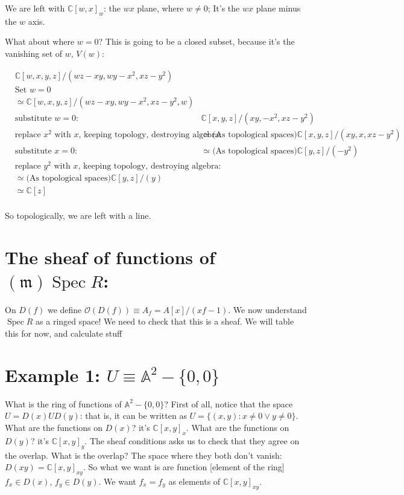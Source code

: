 \documentclass{book}
\newcommand{\C}{\ensuremath{\mathbb{C}}}
\newcommand{\A}{\ensuremath{\mathbb{A}}}
\renewcommand{\O}{\ensuremath{\mathcal{O}}}
\newcommand{\Spec}{\operatorname{Spec}}
\newcommand{\m}{\mathfrak{m}}
\theoremstyle{definition}
\begin{document}
We are left with $\C[w, x]_w$: the $wx$ plane, where $w \neq 0$;
It's the $wx$ plane minus the $w$ axis.

What about where $w = 0$? This is going to be a closed subset, because it's
the vanishing set of $w$, $V(w)$:

\begin{align*}
&\C[w, x, y, z]/(wz - xy, wy - x^2, xz - y^2) \\
&\text{Set $w = 0$} \\
&\simeq \C[w, x, y, z]/(wz - xy, wy - x^2, xz - y^2, w) \\
&\text{substitute $w = 0:$}
&\C[x, y, z]/(xy, - x^2, xz - y^2) \\
&\text{replace $x^2$ with $x$, keeping topology, destroying algebra:}
&\simeq \text{(As topological spaces)} \C[x, y, z]/(xy, x, xz - y^2) \\
&\text{substitute $x = 0:$}
&\simeq \text{(As topological spaces)} \C[y, z]/(- y^2) \\
&\text{replace $y^2$ with $x$, keeping topology, destroying algebra:} \\
&\simeq \text{(As topological spaces)} \C[y, z]/(y) \\
&\simeq \C[z] \\
\end{align*}

So topologically, we are left with a line.

\section{The sheaf of functions of $(\m)\Spec R$:}
On $D(f)$ we define $\O(D(f)) \equiv A_f = A[x]/(xf - 1)$.
We now understand $\Spec R$ as a ringed space!
We need to check that this is a sheaf. 
We will table this for now, and calculate stuff

\section{Example 1: $U \equiv \A^2-\{0, 0\}$}

What is the ring of functions of $\A^2 - \{0, 0 \}$? First of all, notice
that the space $U = D(x) U D(y)$: that is, it can be written as $U = \{ (x, y) : x \neq 0 \lor y \neq 0 \}$.
What are the functions on $D(x)$? it's $\C[x, y]_x$. What are the
functions on $D(y)$? it's $\C[x, y]_y$. The sheaf conditions
asks us to check that they agree on the overlap. What is the overlap?
The space where they both don't vanish: $D(xy) = \C[x, y]_{xy}$. So
what we want is are function [element of the ring]
$f_x \in D(x)$, $f_y \in D(y)$. We want $f_x = f_y$ as elements of
$\C[x, y]_{xy}$.
\end{document}
